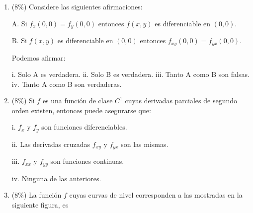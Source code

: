 \documentclass[11pt]{article}
\begin{document}
\begin{enumerate}
\begin{enumerate}
\vspace{4pt}
\noindent i. $f(1,1)=7$. \hspace{1cm} ii. $f_x(1,1)=2$. \hspace{1cm} iii. $f_y(1,1)=2$. \hspace{1cm} iv. Ninguna de las anteriores.

\item{} (8\%) Considere las siguientes afirmaciones:

\vspace{4pt}
\noindent A. Si $f_x(0,0)=f_y(0,0)$ entonces $f(x,y)$ es diferenciable en $(0,0)$.

\noindent B. Si $f(x,y)$ es diferenciable en $(0,0)$ entonces $f_{xy}(0,0)=f_{yx}(0,0)$.

\vspace{4pt}
\noindent Podemos afirmar:

\vspace{4pt}
\noindent i. Solo A es verdadera. \hspace{1cm} ii. Solo B es verdadera. \hspace{1cm} iii. Tanto A como B son falsas. \hspace{1cm} iv. Tanto A como B son verdaderas.

\item{} (8\%) Si $f$ es una función de clase $C^1$ cuyas derivadas parciales de segundo orden existen, entonces puede asegurarse que:

\vspace{4pt}
\noindent i. $f_x$ y $f_y$ son funciones diferenciables.

\noindent ii. Las derivadas cruzadas $f_{xy}$ y $f_{yx}$ son las mismas.

\noindent iii. $f_{xx}$ y $f_{yy}$ son funciones continuas.

\noindent iv. Ninguna de las anteriores.

\item{} (8\%) La función $f$ cuyas curvas de nivel corresponden a las mostradas en la siguiente figura, es

\vspace{6pt}
\begin{center}
\end{center}


\end{enumerate}
\end{enumerate}
\end{document}
